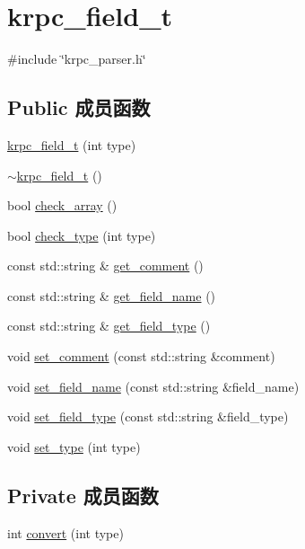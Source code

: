 \hypertarget{classkrpc__field__t}{}\section{krpc\+\_\+field\+\_\+t}
\label{classkrpc__field__t}


{\ttfamily \#include \char`\"{}krpc\+\_\+parser.\+h\char`\"{}}

\subsection*{Public 成员函数}
\begin{DoxyCompactItemize}
\item 
\hyperlink{classkrpc__field__t_a533fb0df560f3cbf33cef86adbd588ea}{krpc\+\_\+field\+\_\+t} (int type)
\item 
\hyperlink{classkrpc__field__t_ae2f3f1056cfc08faacfa49ef51e401fc}{$\sim$krpc\+\_\+field\+\_\+t} ()
\item 
bool \hyperlink{classkrpc__field__t_a13c7bc2a485b1f72d23b6ab7b4385255}{check\+\_\+array} ()
\item 
bool \hyperlink{classkrpc__field__t_a6c4e8a0d1c6c0e653e17c1fbed3c34eb}{check\+\_\+type} (int type)
\item 
const std\+::string \& \hyperlink{classkrpc__field__t_a9128f194c67e1d230e12148e0666388b}{get\+\_\+comment} ()
\item 
const std\+::string \& \hyperlink{classkrpc__field__t_a43f6eb3c22c032a91c20347be4c280bb}{get\+\_\+field\+\_\+name} ()
\item 
const std\+::string \& \hyperlink{classkrpc__field__t_ae53f32d6ebffd00b9d2151088db73395}{get\+\_\+field\+\_\+type} ()
\item 
void \hyperlink{classkrpc__field__t_aa6968b6cbbeffbe137669a2d831a0503}{set\+\_\+comment} (const std\+::string \&comment)
\item 
void \hyperlink{classkrpc__field__t_a34a71d271117b83a1d9105afeac83440}{set\+\_\+field\+\_\+name} (const std\+::string \&field\+\_\+name)
\item 
void \hyperlink{classkrpc__field__t_afc307bbbf9fcd9577e513b01318528f2}{set\+\_\+field\+\_\+type} (const std\+::string \&field\+\_\+type)
\item 
void \hyperlink{classkrpc__field__t_a6c2997a9067e0bae7c072ee52160dddb}{set\+\_\+type} (int type)
\end{DoxyCompactItemize}
\subsection*{Private 成员函数}
\begin{DoxyCompactItemize}
\item 
int \hyperlink{classkrpc__field__t_a9c039eb7fd453f9f5a32d7d9c3a31f8f}{convert} (int type)
\end{DoxyCompactItemize}
